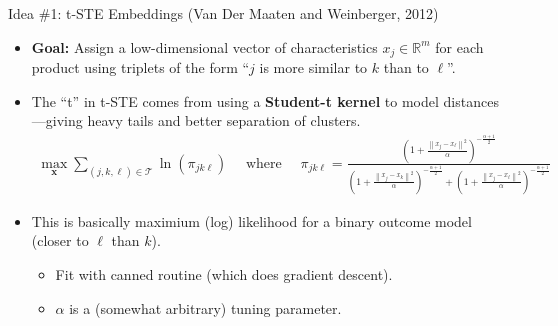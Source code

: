 \documentclass[aspectratio=169,10pt]{beamer}
\begin{document}
\begin{frame}{Idea \#1: t-STE Embeddings (Van Der Maaten and Weinberger, 2012)}
\begin{itemize}
  \item \textbf{Goal:} Assign a low-dimensional vector of characteristics $x_{j} \in \mathbb{R}^m$ for each product using triplets of the form
  “$j$ is more similar to $k$ than to $\ell$”.
  \vspace{0.6em}
  \item The “t” in t-STE comes from using a \textbf{Student-t kernel} 
  to model distances—giving heavy tails and better separation of clusters.
  \begin{align*}
\max _{\mathbf{x}} \sum_{(j, k,\ell) \in \mathcal{T}} \ln \left(\pi_{j k \ell}\right) \quad \text { where } \quad \pi_{ j k \ell}=\frac{\left(1+\frac{\left\|x_j-x_{\ell}\right\|^2}{\alpha}\right)^{-\frac{\alpha+1}{2}}}{\left(1+\frac{\left\|x_j-x_k\right\|^2}{\alpha}\right)^{-\frac{\alpha+1}{2}}+\left(1+\frac{\left\|x_j-x_{\ell}\right\|^2}{\alpha}\right)^{-\frac{\alpha+1}{2}}}
  \end{align*}
  \item This is basically maximium (log) likelihood for a binary outcome model (closer to $\ell$ than $k$).
  \begin{itemize}
        \item Fit with canned routine (which does gradient descent).
        \item $\alpha$ is a (somewhat arbitrary) tuning parameter.
   \end{itemize}

\end{itemize}
\end{frame}
\end{document}
